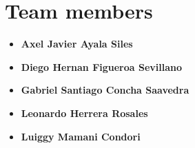 \maketitle
\tableofcontents
\newpage









\section{Team members}
\label{sec:members}
\begin{itemize}
    \item \textbf{Axel Javier Ayala Siles}
    \item \textbf{Diego Hernan Figueroa Sevillano}
    \item \textbf{Gabriel Santiago Concha Saavedra}
    \item \textbf{Leonardo Herrera Rosales}
    \item \textbf{Luiggy Mamani Condori}
\end{itemize}

